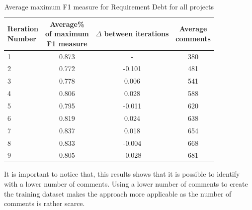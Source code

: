 \begin{table}[!thb]
	\begin{center}
		\caption{Average maximum F1 measure for Requirement Debt for all projects}
		\label{tbl:requirement_iteration_performance}
		\begin{tabular}{l| c c c}
			\toprule
			\thead{Iteration\\Number} & \thead{Average\%\\of maximum\\F1 measure} & \thead{$\Delta$\\between\\iterations} & \thead{Average\\comments} \\
			\midrule
			1  &  0.873 &   -      &  380 \\  
      2  &  0.772 & -0.101   &  481 \\
      3  &  0.778 & 0.006    &  541 \\  
      4  &  0.806 & 0.028    &  588 \\
      5  &  0.795 & -0.011   &  620  \\
      6  &  0.819 & 0.024    &  638  \\
			7  &  0.837 & 0.018    &  654  \\  
      8  &  0.833 & -0.004   &  668  \\  
      9  &  0.805 & -0.028   &  681  \\  
			\bottomrule
		\end{tabular}
	\end{center}    
\end{table}

It is important to notice that, this results shows that it is possible to identify \SATD with a lower number of comments. Using a lower number of comments to create the training dataset makes the approach more applicable as the number of \SATD comments is rather scarce.    

